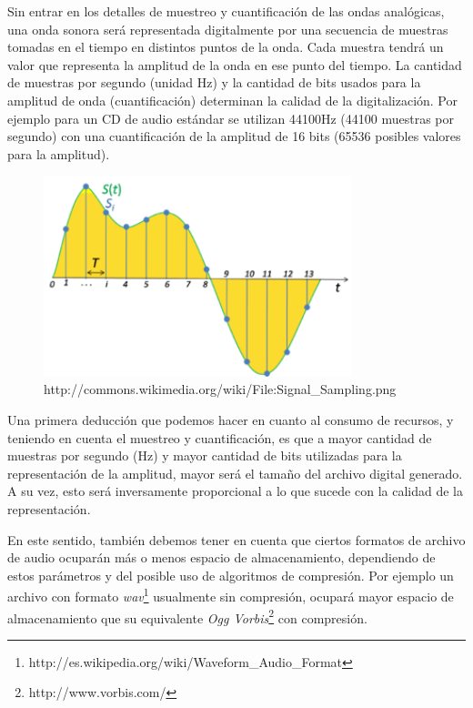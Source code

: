 \documentclass[12pt]{article}
\begin{document}
Sin entrar en los detalles de muestreo y cuantificación de las ondas analógicas, 
una onda sonora será representada digitalmente por una secuencia 
de muestras tomadas en el tiempo en distintos puntos de la onda. Cada muestra 
tendrá un valor que representa la amplitud de la onda en ese punto del tiempo.
La cantidad de muestras por segundo (unidad Hz) y la cantidad de bits usados 
para la amplitud de onda (cuantificación) determinan la calidad de la 
digitalización. Por ejemplo para un CD de audio estándar se utilizan 44100Hz
(44100 muestras por segundo) con una cuantificación de la amplitud de 16 bits
(65536 posibles valores para la amplitud). 


\begin{figure}[h]
\centering
\includegraphics[width=0.8\textwidth]{Sampling.png}
\renewcommand{\figurename}{Fig.}
\caption{http://commons.wikimedia.org/wiki/File:Signal\_Sampling.png}
\label{contexto:figura}
\end{figure}

Una primera deducción que podemos hacer en cuanto al consumo de recursos, y
teniendo en cuenta el muestreo y cuantificación, es que a mayor cantidad de 
muestras por segundo (Hz) y mayor cantidad de bits utilizadas para la
representación de la amplitud, mayor será el tamaño del archivo digital 
generado. A su vez, esto será inversamente proporcional a lo que sucede 
con la calidad de la representación. 

En este sentido, también debemos tener en cuenta que ciertos formatos 
de archivo de audio ocuparán más o menos espacio de almacenamiento, dependiendo 
de estos parámetros y del posible uso de algoritmos de compresión. Por ejemplo 
un archivo con formato {\it wav}\footnote{http://es.wikipedia.org/wiki/Waveform\_Audio\_Format}   
usualmente sin compresión, ocupará mayor espacio de almacenamiento que su
equivalente {\it Ogg Vorbis}\footnote{http://www.vorbis.com/} con 
compresión.
\end{document}
